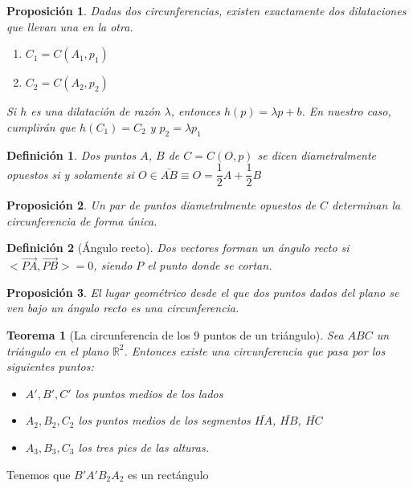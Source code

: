 \documentclass[11pt, a4paper, titlepage]{article}
\makeatletter
\renewenvironment{proof}[1][\proofname] {\vspace{-15pt}\par\pushQED{\qed}\normalfont\topsep6\p@\@plus6\p@\relax\trivlist\item[\hskip\labelsep\it#1\@addpunct{.}]\ignorespaces}{\popQED\endtrivlist\@endpefalse}
\newcommand{\R}{\mathbb{R}}
\renewcommand{\vec}{\overrightarrow}
\theoremstyle{theorem-style}
\newtheorem*{nth}{Teorema}
\newtheorem*{nprop}{Proposición}
\theoremstyle{definition-style}
\newtheorem*{ndef}{Definición}
\theoremstyle{remark-style}
\theoremstyle{example-style}
\makeatother
\begin{document}
\begin{nprop}
	Dadas dos circunferencias, existen exactamente dos dilataciones que llevan una en la otra.
	\begin{enumerate}
	\item $C_1 = C(A_1,p_1)$
	\item $C_2 = C(A_2,p_2)$
\end{enumerate}
Si $h$ es una dilatación de razón $\lambda$, entonces $h(p) = \lambda p + b$.
En nuestro caso, cumplirán que $h(C_1) = C_2$ y $p_2 = \lambda p_1$
\end{nprop}



\begin{ndef}
	Dos puntos $A$, $B$ de $C = C(O,p) $ se dicen diametralmente opuestos si y solamente si $O \in \bar{AB} \equiv O = \dfrac{1}{2}A + \dfrac{1}{2}B$
\end{ndef}


\begin{nprop}
	Un par de puntos diametralmente opuestos de $C$ determinan la circunferencia de forma única.
\end{nprop}

\begin{ndef}[Ángulo recto]
	Dos vectores forman un ángulo recto si $<\vec{PA},\vec{PB}> = 0$, siendo $P$ el punto donde se cortan.
\end{ndef}

\begin{nprop}
	El lugar geométrico desde el que dos puntos dados del plano se ven bajo un ángulo recto es una circunferencia.
\end{nprop}

\begin{nth}[La circunferencia de los 9 puntos de un triángulo]
	Sea $ABC$ un triángulo en el plano $\R^2$. Entonces existe una circunferencia que pasa por los siguientes puntos:
	\begin{itemize}
	\item $A',B',C'$ los puntos medios de los lados
	\item $A_2,B_2,C_2$ los puntos medios de los segmentos $\bar{HA}$, $\bar{HB}$, $\bar{HC}$
	\item $A_3,B_3,C_3$ los tres pies de las alturas.
\end{itemize}
\end{nth}
\begin{proof}
	Tenemos que $B'A'B_2A_2$ es un rectángulo
\end{proof}
\end{document}
